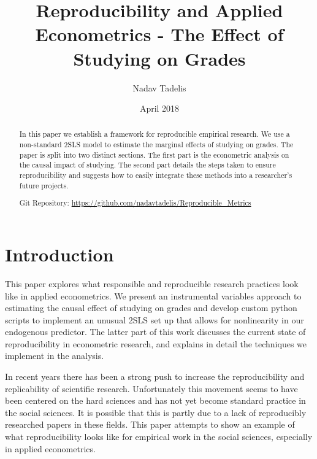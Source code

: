 \documentclass[12pt]{article}
\begin{document}
\title{Reproducibility and Applied Econometrics - The Effect of Studying on Grades}

\author{Nadav Tadelis}

\date{April 2018}



\maketitle

\hskip 80pt 


\begin{abstract}
In this paper we establish a framework for reproducible empirical research. We use a non-standard 2SLS model to estimate the marginal effects of studying on grades. The paper is split into two distinct sections. The first part is the econometric analysis on the causal impact of studying. The second part details the steps taken to ensure reproducibility and suggests how to easily integrate these methods into a researcher's future projects.

\vspace{3mm}
\noindent Git Repository: \url{https://github.com/nadavtadelis/Reproducible_Metrics}
\end{abstract}

\clearpage



\section{Introduction}
\label{sec_intro}
This paper explores what responsible and reproducible research practices look like in applied econometrics. We present an instrumental variables approach to estimating the causal effect of studying on grades and develop custom python scripts to implement an unusual 2SLS set up that allows for nonlinearity in our endogenous predictor. The latter part of this work discusses the current state of reproducibility in econometric research, and explains in detail the techniques we implement in the analysis.

In recent years there has been a strong push to increase the reproducibility and replicability of scientific research. Unfortunately this movement seems to have been centered on the hard sciences and has not yet become standard practice in the social sciences. It is possible that this is partly due to a lack of reproducibly researched papers in these fields. This paper attempts to show an example of what reproducibility looks like for empirical work in the social sciences, especially in applied econometrics.
\end{document}
